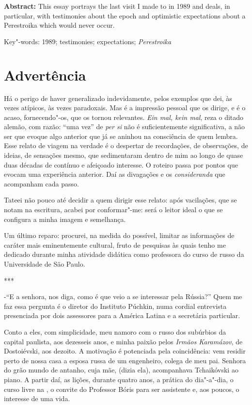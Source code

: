 \textbf{Abstract:} This essay portrays the last visit I made to  in
1989 and deals, in particular, with testimonies about the epoch and
optimistic expectations about a Perestroika which would never occur.

Key"-words: 1989; testimonies; expectations; \emph{Perestroika}

\section{Advertência}

Há o perigo de haver generalizado indevidamente, pelos exemplos que dei,
às vezes atípicos, às vezes paradoxais. Mas é a impressão pessoal que os
dirige, e é o acaso, fornecendo"-os, que os tornou relevantes. \emph{Ein
mal, kein mal}, reza o ditado alemão, com razão: ``uma vez'' de
\emph{per si} não é suficientemente significativa, a não ser que evoque
algo anterior que já se aninhou na consciência de quem lembra. Esse
relato de viagem na verdade é o despertar de recordações, de
observações, de ideias, de sensações mesmo, que sedimentaram dentro de
mim ao longo de quase duas décadas de contínuo e afeiçoado interesse. O
roteiro passa por pontos que evocam uma experiência anterior. Daí as
divagações e os \emph{consideranda} que acompanham cada passo.

Tateei não pouco até decidir a quem dirigir esse relato: após
vacilações, que se notam na escritura, acabei por conformar"-me: será o
leitor ideal o que se configura a minha imagem e semelhança.

Um último reparo: procurei, na medida do possível, limitar as
informações de caráter mais eminentemente cultural, fruto de pesquisas
às quais tenho me dedicado durante minha atividade didática como
professora do curso de russo da Universidade de São Paulo.

***

-``E a senhora, nos diga, como é que veio a se interessar pela Rússia?''
Quem me faz essa pergunta é o diretor do Instituto Púchkin, numa cordial
entrevista presenciada por dois assessores para a América Latina e a
secretária particular.

Conto a eles, com simplicidade, meu namoro com o russo dos subúrbios da
capital paulista, aos dezesseis anos, e minha paixão pelos \emph{Irmãos
Karamázov}, de Dostoiévski, aos dezoito. A motivação é potenciada pela
coincidência: vem residir perto de nossa casa a esposa russa de um
engenheiro, colega de meu pai. Senhora do grão mundo de antanho, cuja
mãe, (dizia ela), acompanhava Tchaikóvski ao piano. A partir daí, as
lições, durante quatro anos, a prática do dia"-a"-dia, o curso livre na
, o convite do Professor Bóris para ser assistente e, aos poucos, o
interesse de uma vida.

